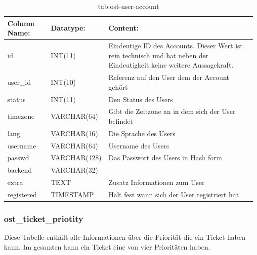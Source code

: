 \begin{table}[h]
	\begin{tabular}{|p{3.5cm}|p{4cm}|p{6.2cm}|}
		\hline
		\textbf{Column Name:} & \textbf{Datatype:} & \textbf{Content:}\\
		\hline
		id & INT(11) & Eindeutige ID des Accounts. Dieser Wert ist rein technisch und hat  neben der Eindeutigkeit keine weitere 
		Aussagekraft.\\
		\hline
		user\_id & INT(10) & Referenz auf den User dem der Account gehört\\
		\hline
		status& INT(11) & Den Status des Users \\
		\hline
		timezone & VARCHAR(64) & Gibt die Zeitzone an in dem sich der User befindet\\
		\hline
		lang & VARCHAR(16) & Die Sprache des Users\\
		\hline
		username & VARCHAR(64) & Username des Users\\
		\hline
		passwd & VARCHAR(128) & Das Passwort des Users in Hash form\\
		\hline
		backend & VARCHAR(32) &\\
		\hline
		extra & TEXT & Zusatz Informationen zum User\\
		\hline
		registered & TIMESTAMP & Hält fest wann sich der User registriert hat\\
		\hline
		
	\end{tabular}
	\caption{tab:ost-user-account}
\end{table}
\label{tab:ost_user_account}

\newpage

\subsubsection{ost\_ticket\_priotity}

Diese Tabelle enthält alle Informationen über die Priorität die ein Ticket haben kann.
Im gesamten kann ein Ticket eine von vier Prioritäten haben.


